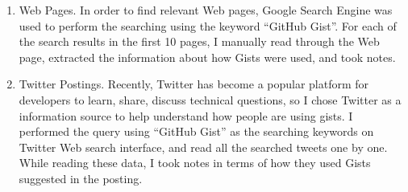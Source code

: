 \begin{enumerate}
	\item Web Pages. In order to find relevant Web pages, Google Search Engine was used to perform the searching using the keyword ``GitHub Gist''. For each of the search results in the first 10 pages, I manually read through the Web page, extracted the information about how Gists were used, and took notes.

	\item Twitter Postings. Recently, Twitter has become a popular platform for developers to learn, share, discuss technical questions, so I chose Twitter as a information source to help understand how people are using gists. I performed the query using ``GitHub Gist'' as the searching keywords on Twitter Web search interface, and read all the searched tweets one by one. While reading these data, I took notes in terms of how they used Gists suggested in the posting. 
\end{enumerate}